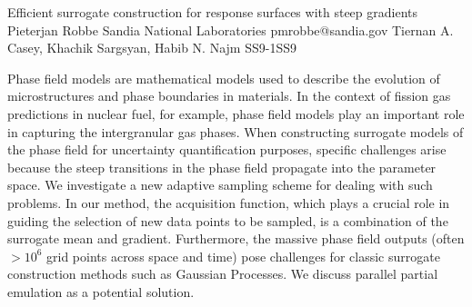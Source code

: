 \begin{talk}
  {Efficient surrogate construction for response surfaces with steep gradients}%
  {Pieterjan Robbe}%
  {Sandia National Laboratories}%
  {pmrobbe@sandia.gov}%
  {Tiernan A. Casey, Khachik Sargsyan, Habib N. Najm}%
{}{}{SS9-1}{SS9}


				
				

Phase field models are mathematical models used to describe the evolution of microstructures and phase boundaries in materials. In the context of fission gas predictions in nuclear fuel, for example, phase field models play an important role in capturing the intergranular gas phases. When constructing surrogate models of the phase field for uncertainty quantification purposes, specific challenges arise because the steep transitions in the phase field propagate into the parameter space. We investigate a new adaptive sampling scheme for dealing with such problems. In our method, the acquisition function, which plays a crucial role in guiding the selection of new data points to be sampled, is a combination of the surrogate mean and gradient. Furthermore, the massive phase field outputs (often $> 10^6$ grid points across space and time) pose challenges for classic surrogate construction methods such as Gaussian Processes. We discuss parallel partial emulation as a potential solution.
\end{talk}

